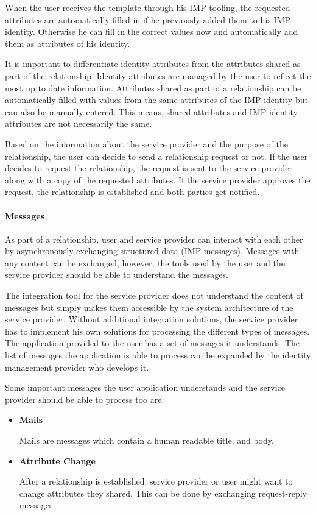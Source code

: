 When the user receives the template through his IMP tooling, the requested attributes are automatically filled in if he previously added them to his IMP identity. Otherwise he can fill in the correct values now and automatically add them as attributes of his identity.

It is important to differentiate identity attributes from the attributes shared as part of the relationship. Identity attributes are managed by the user to reflect the most up to date information. Attributes shared as part of a relationship can be automatically filled with values from the same attributes of the IMP identity but can also be manually entered. This means, shared attributes and IMP identity attributes are not necessarily the same.

Based on the information about the service provider and the purpose of the relationship, the user can decide to send a relationship request or not. If the user decides to request the relationship, the request is sent to the service provider along with a copy of the requested attributes. If the service provider approves the request, the relationship is established and both parties get notified.

\paragraph{Messages} As part of a relationship, user and service provider can interact with each other by asynchronously exchanging structured data (IMP messages). Messages with any content can be exchanged, however, the tools used by the user and the service provider should be able to understand the messages.

The integration tool for the service provider does not understand the content of messages but simply makes them accessible by the system architecture of the service provider. Without additional integration solutions, the service provider has to implement his own solutions for processing the different types of messages. The application provided to the user has a set of messages it understands. The list of messages the application is able to process can be expanded by the identity management provider who develops it.

Some important messages the user application understands and the service provider should be able to process too are:

\begin{itemize}
    \item \textbf{Mails}
    
    Mails are messages which contain a human readable title, and body.
    
    \item \textbf{Attribute Change}
    
    After a relationship is established, service provider or user might want to change attributes they shared. This can be done by exchanging request-reply messages.
\end{itemize}

